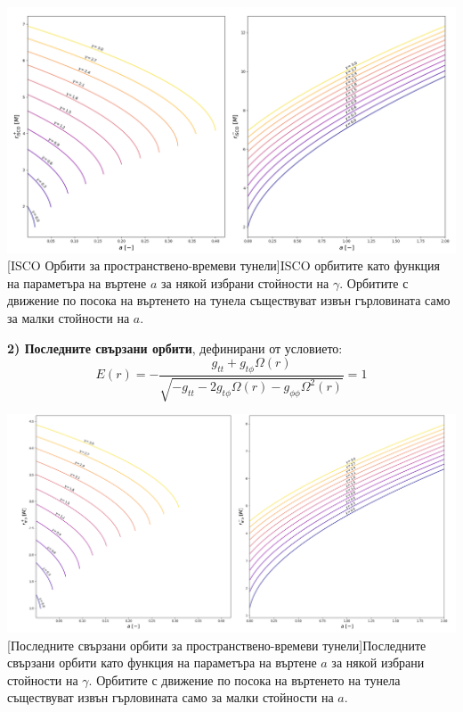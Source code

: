 \hspace{-0.5cm}
\includegraphics[scale = 0.3]{WH_ISCO.png}
[ISCO Орбити за пространствено-времеви тунели]{\small ISCO орбитите като функция на параметъра на въртене $a$ за някой избрани стойности на $\gamma$. Орбитите с движение по посока на въртенето на тунела съществуват извън гърловината само за малки стойности на $a$.}
\label{WH_ISCO}

$ $\newline\textbf{2) Последните свързани орбити}, дефинирани от условието:
\begin{equation}
	E(r) = -\frac{g_{tt} + g_{t\phi}\Omega(r)}{\sqrt{-g_{tt} - 2g_{t\phi}\Omega(r) - g_{\phi\phi}\Omega^2(r)}} = 1
\end{equation}

\hspace{-0.5cm}
\includegraphics[scale = 0.25]{WH_mb.png}
[Последните свързани орбити за пространствено-времеви тунели]{\small Последните свързани орбити като функция на параметъра на въртене $a$ за някой избрани стойности на $\gamma$. Орбитите с движение по посока на въртенето на тунела съществуват извън гърловината само за малки стойности на $a$.}
\label{WH_mb}

